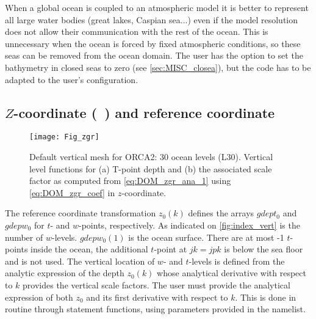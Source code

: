 \documentclass[../main/NEMO_manual]{subfiles}
\begin{document}
When a global ocean is coupled to an atmospheric model it is better to represent all large water bodies
(\eg great lakes, Caspian sea...) even if the model resolution does not allow their communication with
the rest of the ocean.
This is unnecessary when the ocean is forced by fixed atmospheric conditions,
so these seas can be removed from the ocean domain.
The user has the option to set the bathymetry in closed seas to zero (see \autoref{sec:MISC_closea}),
but the code has to be adapted to the user's configuration.

\subsection[$Z$-coordinate (\protect\np{ln\_zco}~\forcode{= .true.}) and ref. coordinate]
				{$Z$-coordinate (\protect{}~) and reference coordinate}
\label{subsec:DOM_zco}

\begin{figure}[!tb]
  \begin{center}
    \texttt{[image: Fig\_zgr]}
    \caption{
      \protect\label{fig:zgr}
      Default vertical mesh for ORCA2: 30 ocean levels (L30).
      Vertical level functions for (a) T-point depth and (b) the associated scale factor as computed from
      \autoref{eq:DOM_zgr_ana_1} using \autoref{eq:DOM_zgr_coef} in $z$-coordinate.
    }
  \end{center}
\end{figure}

The reference coordinate transformation $z_0(k)$ defines the arrays $gdept_0$ and $gdepw_0$ for $t$- and $w$-points,
respectively.
As indicated on \autoref{fig:index_vert}  is the number of $w$-levels.
$gdepw_0(1)$ is the ocean surface.
There are at most -1 $t$-points inside the ocean,
the additional $t$-point at $jk = jpk$ is below the sea floor and is not used.
The vertical location of $w$- and $t$-levels is defined from the analytic expression of the depth $z_0(k)$ whose
analytical derivative with respect to $k$ provides the vertical scale factors.
The user must provide the analytical expression of both $z_0$ and its first derivative with respect to $k$.
This is done in routine  through statement functions,
using parameters provided in the  namelist.
\end{document}
